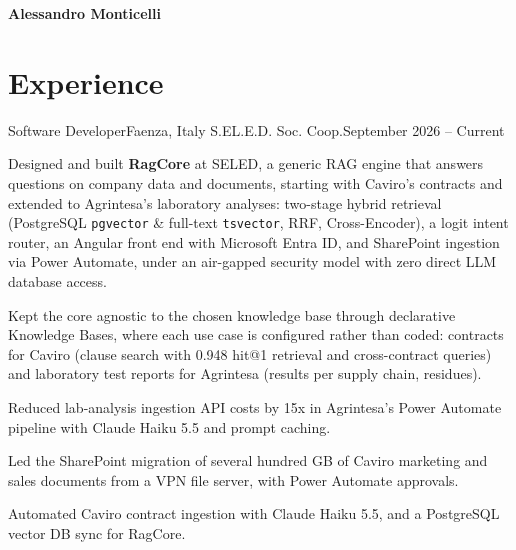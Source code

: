 \documentclass[letterpaper,11pt,english]{article}
\begin{document}
\setlength{\footskip}{5pt}
\centering\textbf{\Large Alessandro Monticelli} \\
\vspace{0.08in}

\section{Experience}
\resumeSubHeadingListStart
\resumeSubheading
{Software Developer}{Faenza, Italy}
{S.EL.E.D. Soc. Coop.}{September 2026 -- Current}
\resumeItemListStart
  \item\small{Designed and built \textbf{RagCore} at SELED, a generic RAG engine that answers questions on company data and documents, starting with Caviro's contracts and extended to Agrintesa's laboratory analyses: two-stage hybrid retrieval (PostgreSQL \texttt{pgvector} \& full-text \texttt{tsvector}, RRF, Cross-Encoder), a logit intent router, an Angular front end with Microsoft Entra ID, and SharePoint ingestion via Power Automate, under an air-gapped security model with zero direct LLM database access.}
  \item\small{Kept the core agnostic to the chosen knowledge base through declarative Knowledge Bases, where each use case is configured rather than coded: contracts for Caviro (clause search with 0.948 hit@1 retrieval and cross-contract queries) and laboratory test reports for Agrintesa (results per supply chain, residues).}
  \item\small{Reduced lab-analysis ingestion API costs by 15x in Agrintesa's Power Automate pipeline with Claude Haiku 5.5 and prompt caching.}
  \item\small{Led the SharePoint migration of several hundred GB of Caviro marketing and sales documents from a VPN file server, with Power Automate approvals.}
  \item\small{Automated Caviro contract ingestion with Claude Haiku 5.5, and a PostgreSQL vector DB sync for RagCore.}
\end{document}
